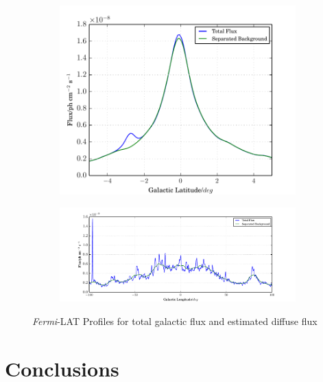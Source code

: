 \documentclass{PoS}
\begin{document}
\begin{figure}
\centering
\begin{subfigure}{0.3\textwidth}
      \includegraphics[width=\textwidth]{figures/GLAT.pdf}
\end{subfigure}
\begin{subfigure}{0.6\textwidth}
        \includegraphics[width=\textwidth]{figures/GLON.pdf}
\end{subfigure}
\caption{\textit{Fermi}-LAT Profiles for total galactic flux and estimated diffuse flux}
\end{figure}

\section{Conclusions}
\end{document}
